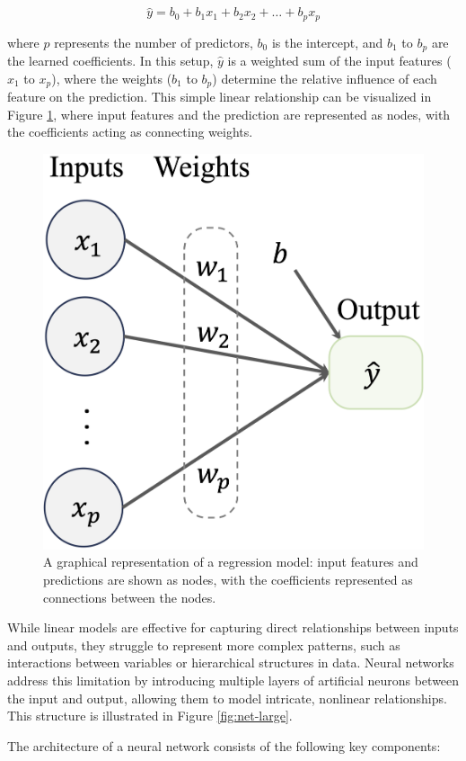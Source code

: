 \documentclass[
  11pt,
]{book}
\theoremstyle{definition}
\theoremstyle{definition}
\theoremstyle{definition}
\theoremstyle{definition}
\theoremstyle{remark}
\begin{document}
\[
\hat{y} = b_0 + b_1 x_1 + b_2 x_2 + \dots + b_p x_p
\]

where \(p\) represents the number of predictors, \(b_0\) is the intercept, and \(b_1\) to \(b_p\) are the learned coefficients. In this setup, \(\hat{y}\) is a weighted sum of the input features (\(x_1\) to \(x_p\)), where the weights (\(b_1\) to \(b_p\)) determine the relative influence of each feature on the prediction. This simple linear relationship can be visualized in Figure \ref{fig:net-reg}, where input features and the prediction are represented as nodes, with the coefficients acting as connecting weights.

\begin{figure}[H]

{\centering \includegraphics[width=0.4\linewidth]{images/ch12_net_reg} 

}

\caption{A graphical representation of a regression model: input features and predictions are shown as nodes, with the coefficients represented as connections between the nodes.}\label{fig:net-reg}
\end{figure}

While linear models are effective for capturing direct relationships between inputs and outputs, they struggle to represent more complex patterns, such as interactions between variables or hierarchical structures in data. Neural networks address this limitation by introducing multiple layers of artificial neurons between the input and output, allowing them to model intricate, nonlinear relationships. This structure is illustrated in Figure \ref{fig:net-large}.

The architecture of a neural network consists of the following key components:
\end{document}

